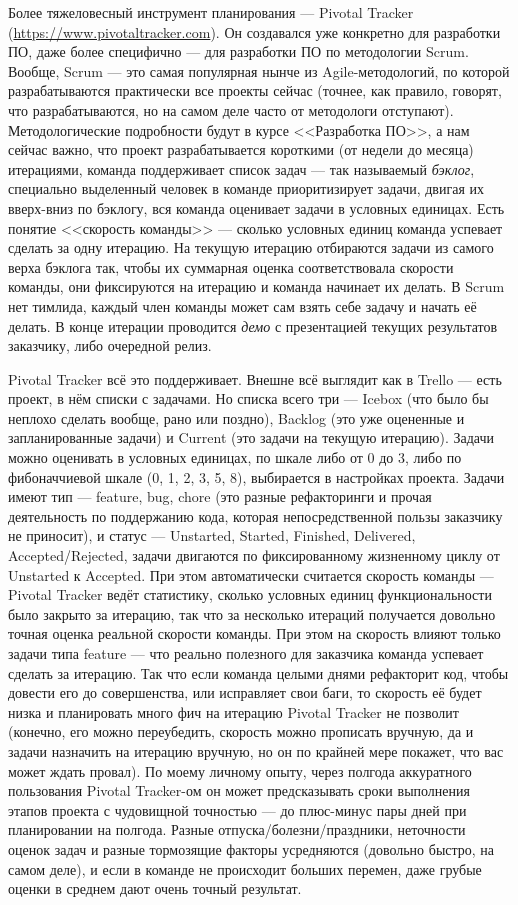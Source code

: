 \documentclass{../../text-style}
\begin{document}
Более тяжеловесный инструмент планирования --- Pivotal Tracker (\url{https://www.pivotaltracker.com}). Он создавался уже конкретно для разработки ПО, даже более специфично --- для разработки ПО по методологии Scrum. Вообще, Scrum --- это самая популярная нынче из Agile-методологий, по которой разрабатываются практически все проекты сейчас (точнее, как правило, говорят, что разрабатываются, но на самом деле часто от методологи отступают). Методологические подробности будут в курсе <<Разработка ПО>>, а нам сейчас важно, что проект разрабатывается короткими (от недели до месяца) итерациями, команда поддерживает список задач --- так называемый \textit{бэклог}, специально выделенный человек в команде приоритизирует задачи, двигая их вверх-вниз по бэклогу, вся команда оценивает задачи в условных единицах. Есть понятие <<скорость команды>> --- сколько условных единиц команда успевает сделать за одну итерацию. На текущую итерацию отбираются задачи из самого верха бэклога так, чтобы их суммарная оценка соответствовала скорости команды, они фиксируются на итерацию и команда начинает их делать. В Scrum нет тимлида, каждый член команды может сам взять себе задачу и начать её делать. В конце итерации проводится \textit{демо} с презентацией текущих результатов заказчику, либо очередной релиз.

Pivotal Tracker всё это поддерживает. Внешне всё выглядит как в Trello --- есть проект, в нём списки с задачами. Но списка всего три --- Icebox (что было бы неплохо сделать вообще, рано или поздно), Backlog (это уже оцененные и запланированные задачи) и Current (это задачи на текущую итерацию). Задачи можно оценивать в условных единицах, по шкале либо от 0 до 3, либо по фибоначчиевой шкале (0, 1, 2, 3, 5, 8), выбирается в настройках проекта. Задачи имеют тип --- feature, bug, chore (это разные рефакторинги и прочая деятельность по поддержанию кода, которая непосредственной пользы заказчику не приносит), и статус --- Unstarted, Started, Finished, Delivered, Accepted/Rejected, задачи двигаются по фиксированному жизненному циклу от Unstarted к Accepted. При этом автоматически считается скорость команды --- Pivotal Tracker ведёт статистику, сколько условных единиц функциональности было закрыто за итерацию, так что за несколько итераций получается довольно точная оценка реальной скорости команды. При этом на скорость влияют только задачи типа feature --- что реально полезного для заказчика команда успевает сделать за итерацию. Так что если команда целыми днями рефакторит код, чтобы довести его до совершенства, или исправляет свои баги, то скорость её будет низка и планировать много фич на итерацию Pivotal Tracker не позволит (конечно, его можно переубедить, скорость можно прописать вручную, да и задачи назначить на итерацию вручную, но он по крайней мере покажет, что вас может ждать провал). По моему личному опыту, через полгода аккуратного пользования Pivotal Tracker-ом он может предсказывать сроки выполнения этапов проекта с чудовищной точностью --- до плюс-минус пары дней при планировании на полгода. Разные отпуска/болезни/праздники, неточности оценок задач и разные тормозящие факторы усредняются (довольно быстро, на самом деле), и если в команде не происходит больших перемен, даже грубые оценки в среднем дают очень точный результат.
\end{document}

